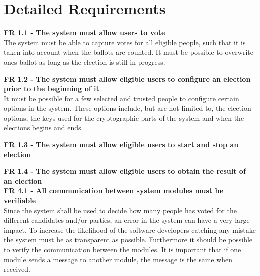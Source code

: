 \chapter{Detailed Requirements}

\textbf{FR 1.1 - The system must allow users to vote} \\
The system must be able to capture votes for all eligible people, such that it is taken into account when the ballots are counted. It must be possible to overwrite ones ballot as long as the election is still in progress.

\textbf{FR 1.2 - The system must allow eligible users to configure an election prior to the beginning of it} \\
It must be possible for a few selected and trusted people to configure certain options in the system. These options include, but are not limited to, the election options, the keys used for the cryptographic parts of the system and when the elections begins and ends.

\textbf{FR 1.3 - The system must allow eligible users to start and stop an election}

\textbf{FR 1.4 - The system must allow eligible users to obtain the result of an election} \\


\textbf{FR 4.1 - All communication between system modules must be verifiable} \\
Since the system shall be used to decide how many people has voted for the different candidates and/or parties, an error in the system can have a very large impact. To increase the likelihood of the software developers catching any mistake the system must be as transparent as possible. Furthermore it should be possible to verify the communication between the modules. It is important that if one module sends a message to another module, the message is the same when received.